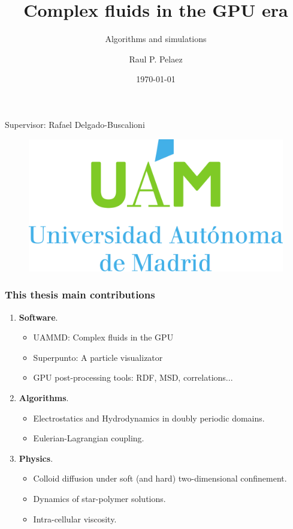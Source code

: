 \documentclass[xcolor=dvipsnames]{beamer}
\title{Complex fluids in the GPU era}
\subtitle{Algorithms and simulations}
\author{Raul P. Pelaez}
\institute{Universidad Autónoma de Madrid}
\date{\today}
\begin{document}
\begin{frame}
  \titlepage
  \centering
\small  Supervisor: Rafael Delgado-Buscalioni
  \begin{figure}
    \centering
    \includegraphics[width=0.25\linewidth]{UAMlogo}
  \end{figure}
\end{frame}

\begin{frame}
  \frametitle{This thesis main contributions}
  \begin{enumerate}
    \Large\color{blue}
  \item \textbf{Software}.
    \begin{itemize}
    \item<+-> UAMMD: Complex fluids in the GPU      
    \item<+-> Superpunto: A particle visualizator
    \item<+-> GPU post-processing tools: RDF, MSD, correlations...
    \end{itemize}
  \item<+-> \textbf{Algorithms}.
    \begin{itemize}
    \item<+-> Electrostatics and Hydrodynamics in doubly periodic domains.
    \item<+-> Eulerian-Lagrangian coupling.
    \end{itemize}
  \item<+-> \textbf{Physics}.
    \begin{itemize}
    \item<+-> Colloid diffusion under soft (and hard) two-dimensional confinement.
    \item<+-> Dynamics of star-polymer solutions.
    \item<+-> Intra-cellular viscosity.
    \end{itemize}
  \end{enumerate}
\end{frame}
\end{document}
